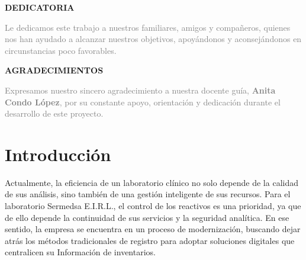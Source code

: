 \documentclass[12pt,a4paper]{article}
\begin{document}
\thispagestyle{empty}
\imprimircaratula
\clearpage


\begin{center}
    \vspace*{3cm}
    \normalsize \textbf{DEDICATORIA}
    \vspace{6cm}
\end{center}
\hspace{7.9cm}
\begin{minipage}{\dimexpr\textwidth-8cm}
    \textcolor{gray}{
        Le dedicamos este trabajo a nuestros familiares, amigos y compañeros,
        quienes nos han ayudado a alcanzar nuestros objetivos, apoyándonos y
        aconsejándonos en circunstancias poco favorables.
    }
\end{minipage}

\newpage

\begin{center}
    \vspace*{3cm}
    \normalsize \textbf{AGRADECIMIENTOS}
    \vspace{6cm}
\end{center}
\hspace{7.9cm}
\begin{minipage}{\dimexpr\textwidth-8cm}
    \textcolor{gray}{
        Expresamos nuestro sincero agradecimiento a nuestra docente guía, \textbf{Anita Condo López}, por su constante apoyo, orientación y dedicación durante el desarrollo de este proyecto.
    }
\end{minipage}

\newpage



\setcounter{page}{1}

\begin{singlespace}
    \tableofcontents \newpage
\end{singlespace}



\section*{\centering Introducción}

Actualmente, la eficiencia de un laboratorio clínico no solo depende de la calidad de sus análisis, sino también de una gestión inteligente de sus recursos. Para el laboratorio Sermedsa E.I.R.L., el control de los reactivos es una prioridad, ya que de ello depende la continuidad de sus servicios y la seguridad analítica. En ese sentido, la empresa se encuentra en un proceso de modernización, buscando dejar atrás los métodos tradicionales de registro para adoptar soluciones digitales que centralicen su Información de inventarios.
\end{document}
